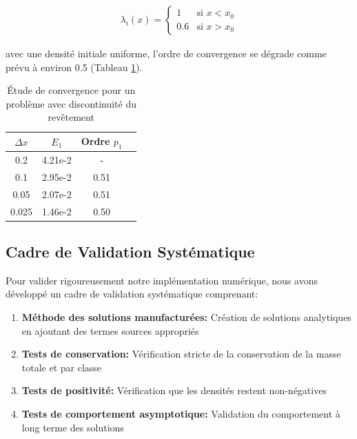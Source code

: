 \begin{align}
\lambda_i(x) = 
\begin{cases}
1 & \text{si } x < x_0\\
0.6 & \text{si } x > x_0
\end{cases}
\end{align}

avec une densité initiale uniforme, l'ordre de convergence se dégrade comme prévu à environ 0.5 (Tableau \ref{tab:conv_revetement}).

\begin{table}[htbp]
\centering
\caption{Étude de convergence pour un problème avec discontinuité du revêtement}
\label{tab:conv_revetement}
\begin{tabular}{cccc}
\toprule
$\Delta x$ & $E_1$ & Ordre $p_1$ \\
\midrule
0.2 & 4.21e-2 & - \\
0.1 & 2.95e-2 & 0.51 \\
0.05 & 2.07e-2 & 0.51 \\
0.025 & 1.46e-2 & 0.50 \\
\bottomrule
\end{tabular}
\end{table}

\subsection{Cadre de Validation Systématique}
\label{subsec:cadre_validation}

Pour valider rigoureusement notre implémentation numérique, nous avons développé un cadre de validation systématique comprenant:

\begin{enumerate}
    \item \textbf{Méthode des solutions manufacturées:} Création de solutions analytiques en ajoutant des termes sources appropriés
    \item \textbf{Tests de conservation:} Vérification stricte de la conservation de la masse totale et par classe
    \item \textbf{Tests de positivité:} Vérification que les densités restent non-négatives
    \item \textbf{Tests de comportement asymptotique:} Validation du comportement à long terme des solutions
\end{enumerate}


